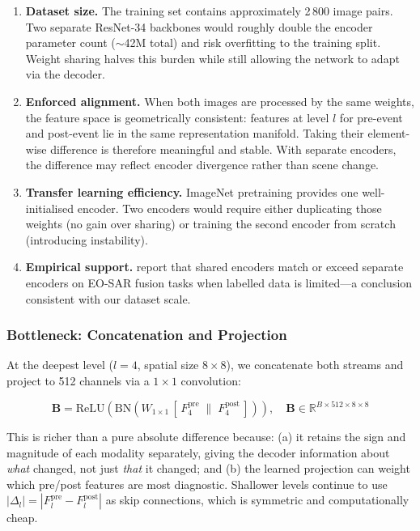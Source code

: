 \documentclass[12pt,a4paper]{article}
\begin{document}
\begin{enumerate}[leftmargin=*]
  \item \textbf{Dataset size.}  The training set contains approximately 2\,800 image
    pairs.  Two separate ResNet-34 backbones would roughly double the encoder parameter
    count ($\sim$42M total) and risk overfitting to the training split.  Weight sharing
    halves this burden while still allowing the network to adapt via the decoder.

  \item \textbf{Enforced alignment.}  When both images are processed by the same weights,
    the feature space is geometrically consistent: features at level $l$ for pre-event and
    post-event lie in the same representation manifold.  Taking their element-wise
    difference is therefore meaningful and stable.  With separate encoders, the difference
    may reflect encoder divergence rather than scene change.

  \item \textbf{Transfer learning efficiency.}  ImageNet pretraining provides one
    well-initialised encoder.  Two encoders would require either duplicating those weights
    (no gain over sharing) or training the second encoder from scratch (introducing
    instability).

  \item \textbf{Empirical support.}  \citet{li2022eo_sar} report that shared encoders
    match or exceed separate encoders on EO-SAR fusion tasks when labelled data is
    limited---a conclusion consistent with our dataset scale.
\end{enumerate}

\subsubsection{Bottleneck: Concatenation and Projection}

At the deepest level ($l=4$, spatial size $8\times8$), we concatenate both streams
and project to 512 channels via a $1\times1$ convolution:

\[
\mathbf{B} = \text{ReLU}\!\left(\text{BN}\!\left(W_{1\times1}\,
  [\,F^{\text{pre}}_4 \;\|\; F^{\text{post}}_4\,]\right)\right), \quad
\mathbf{B} \in \mathbb{R}^{B\times512\times8\times8}
\]

This is richer than a pure absolute difference because:
(a) it retains the sign and magnitude of each modality separately, giving the decoder
information about \emph{what} changed, not just \emph{that} it changed; and
(b) the learned projection can weight which pre/post features are most diagnostic.
Shallower levels continue to use $|\Delta_l| = |F^{\text{pre}}_l - F^{\text{post}}_l|$
as skip connections, which is symmetric and computationally cheap.
\end{document}
